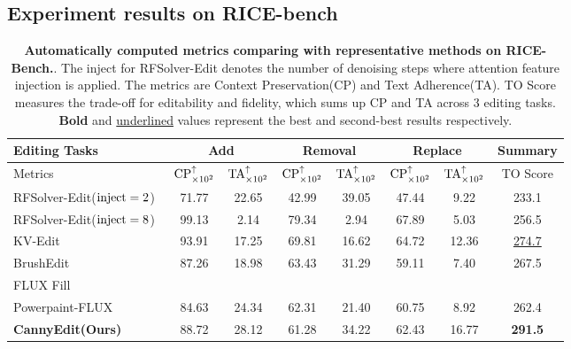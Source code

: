 \documentclass{article}
\begin{document}
\subsection{Experiment results on RICE-bench}

\begin{table}[t]
\begin{center} 
\footnotesize
\setlength{\tabcolsep}{1.70mm} %
\caption{\textbf{Automatically computed metrics comparing with representative methods on RICE-Bench.}.  The inject for RFSolver-Edit denotes the number of denoising steps where attention feature injection is applied. The metrics are Context Preservation(CP) and Text Adherence(TA). TO Score measures the trade-off for editability and fidelity, which sums up CP and TA across 3 editing tasks. \textbf{Bold} and \underline{underlined} values represent the best and second-best results respectively.}
\begin{tabular}{l|cc|cc|cc|c}
\toprule
\multirow{2}{*}[0.8ex]{Editing Tasks} & \multicolumn{2}{c|}{Add} & \multicolumn{2}{c|}{Removal} &\multicolumn{2}{c|}{Replace} & Summary\\
\midrule
 Metrics & $\textup{CP}_{\times 10^2}^{\uparrow}$ & $\textup{TA}_{\times 10^2}^{\uparrow}$ & $\textup{CP}_{\times 10^2}^{\uparrow}$ & $\textup{TA}_{\times 10^2}^{\uparrow}$ & $\textup{CP}_{\times 10^2}^{\uparrow}$ & $\textup{TA}_{\times 10^2}^{\uparrow}$ & TO Score\\
\midrule
RFSolver-Edit($\textup{inject}=2$)~\cite{wang2024taming} & 71.77 & 22.65 & 42.99 & {39.05} & 47.44 & 9.22 & 233.1\\
RFSolver-Edit($\textup{inject}=8$)~\cite{wang2024taming} & {99.13} & 2.14 & {79.34} & 2.94 & {67.89} & 5.03 & 256.5\\
KV-Edit~\cite{zhu2025kv} & {93.91} & 17.25 & {69.81} & 16.62 & {64.72} & {12.36} & \underline{274.7}\\
BrushEdit~\cite{li2024brushedit} & 87.26 & 18.98 & 63.43 & 31.29 & 59.11 & 7.40 & 267.5\\
FLUX Fill~\cite{blackforest2024FLUX} & & & & & & & \\
Powerpaint-FLUX~\cite{zhuang2023task} & 84.63 & {24.34} & 62.31 & 21.40 & 60.75 & 8.92 & 262.4\\
\midrule
\textbf{CannyEdit(Ours)} & 88.72 & {28.12} & 61.28 & {34.22} & 62.43 & {16.77} & \textbf{291.5}\\
\bottomrule
\end{tabular}
\label{tab:rice-comparison} 
\end{center}


\end{table}
\end{document}
